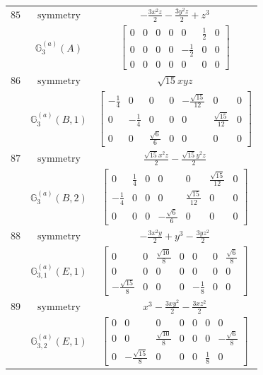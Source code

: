 \documentclass[fleqn,8pt,landscape]{jsarticle}
\begin{document}
\begin{longtable}{ccc}
$ 85 $ & $ \text{symmetry} $ & $ - \frac{3 x^{2} z}{2} - \frac{3 y^{2} z}{2} + z^{3} $ \\
$  $ & $ \mathbb{G}_{3}^{(a)}(A) $ & $ \begin{bmatrix} 0 & 0 & 0 & 0 & 0 & \frac{1}{2} & 0 \\ 0 & 0 & 0 & 0 & - \frac{1}{2} & 0 & 0 \\ 0 & 0 & 0 & 0 & 0 & 0 & 0 \end{bmatrix} $ \\ \hline
$ 86 $ & $ \text{symmetry} $ & $ \sqrt{15} x y z $ \\
$  $ & $ \mathbb{G}_{3}^{(a)}(B,1) $ & $ \begin{bmatrix} - \frac{1}{4} & 0 & 0 & 0 & - \frac{\sqrt{15}}{12} & 0 & 0 \\ 0 & - \frac{1}{4} & 0 & 0 & 0 & \frac{\sqrt{15}}{12} & 0 \\ 0 & 0 & \frac{\sqrt{6}}{6} & 0 & 0 & 0 & 0 \end{bmatrix} $ \\ \hline
$ 87 $ & $ \text{symmetry} $ & $ \frac{\sqrt{15} x^{2} z}{2} - \frac{\sqrt{15} y^{2} z}{2} $ \\
$  $ & $ \mathbb{G}_{3}^{(a)}(B,2) $ & $ \begin{bmatrix} 0 & \frac{1}{4} & 0 & 0 & 0 & \frac{\sqrt{15}}{12} & 0 \\ - \frac{1}{4} & 0 & 0 & 0 & \frac{\sqrt{15}}{12} & 0 & 0 \\ 0 & 0 & 0 & - \frac{\sqrt{6}}{6} & 0 & 0 & 0 \end{bmatrix} $ \\ \hline
$ 88 $ & $ \text{symmetry} $ & $ - \frac{3 x^{2} y}{2} + y^{3} - \frac{3 y z^{2}}{2} $ \\
$  $ & $ \mathbb{G}_{3,1}^{(a)}(E,1) $ & $ \begin{bmatrix} 0 & 0 & \frac{\sqrt{10}}{8} & 0 & 0 & 0 & \frac{\sqrt{6}}{8} \\ 0 & 0 & 0 & 0 & 0 & 0 & 0 \\ - \frac{\sqrt{15}}{8} & 0 & 0 & 0 & - \frac{1}{8} & 0 & 0 \end{bmatrix} $ \\ \hline
$ 89 $ & $ \text{symmetry} $ & $ x^{3} - \frac{3 x y^{2}}{2} - \frac{3 x z^{2}}{2} $ \\
$  $ & $ \mathbb{G}_{3,2}^{(a)}(E,1) $ & $ \begin{bmatrix} 0 & 0 & 0 & 0 & 0 & 0 & 0 \\ 0 & 0 & \frac{\sqrt{10}}{8} & 0 & 0 & 0 & - \frac{\sqrt{6}}{8} \\ 0 & - \frac{\sqrt{15}}{8} & 0 & 0 & 0 & \frac{1}{8} & 0 \end{bmatrix} $ \\ \hline

\end{longtable}
\end{document}
